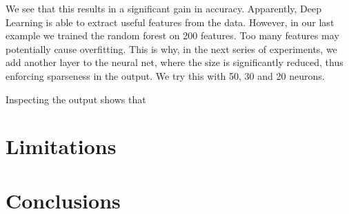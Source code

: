\documentclass[paper=a4, fontsize=11pt]{scrartcl}
\numberwithin{equation}{section}
\numberwithin{figure}{section}
\numberwithin{table}{section}
\begin{document}
We see that this results in a significant gain in accuracy. Apparently, Deep Learning is able to extract useful features from the data. However, in our last example we trained the random forest on 200 features. Too many features may potentially cause overfitting. This is why, in the next series of experiments, we add another layer to the neural net, where the size is significantly reduced, thus enforcing sparseness in the output. We try this with 50, 30 and 20 neurons. 


Inspecting the output shows that



\section{Limitations}



\section{Conclusions}

\end{document}
